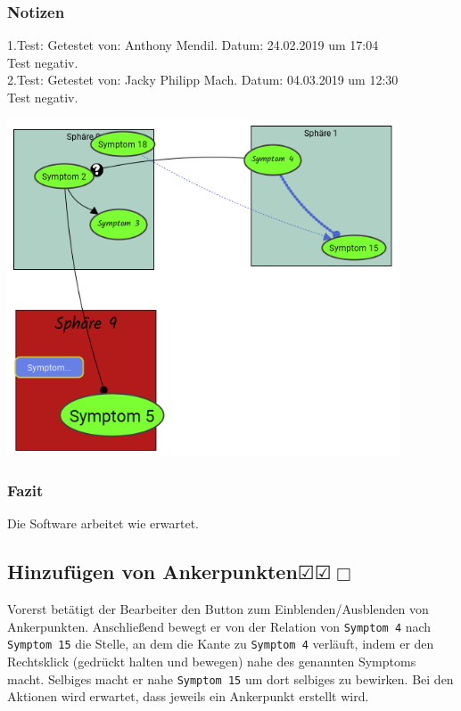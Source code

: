 \documentclass[enabledeprecatedfontcommands]{scrartcl}
\newcommand{\subsectiont}[2]{\subsection[#1]{#1{\normalsize\normalfont #2}}}
\newcommand{\leer}{$\Box$}
\newcommand{\ok}{$\CheckedBox$}
\begin{document}
\subsubsection{Notizen}
1.Test: Getestet von: Anthony Mendil. Datum: 24.02.2019 um 17:04 \\
Test negativ. \\
2.Test: Getestet von: Jacky Philipp Mach. Datum: 04.03.2019 um 12:30 \\
Test negativ.
\begin{center}
\includegraphics[height=10cm]{3_36.PNG}
\end{center}
\subsubsection{Fazit}
Die Software arbeitet wie erwartet.

\subsectiont{Hinzufügen von Ankerpunkten}{\dotfill\ok\ok\leer}
Vorerst betätigt der Bearbeiter den Button zum Einblenden/Ausblenden von Ankerpunkten. Anschließend bewegt er von der Relation von \texttt{Symptom 4} nach \texttt{Symptom 15} die Stelle, an dem die Kante zu \texttt{Symptom 4} verläuft, indem er den Rechtsklick (gedrückt halten und bewegen) nahe des genannten Symptoms macht. Selbiges macht er nahe \texttt{Symptom 15} um dort selbiges zu bewirken. Bei den Aktionen wird erwartet, dass jeweils ein Ankerpunkt erstellt wird.
\end{document}
